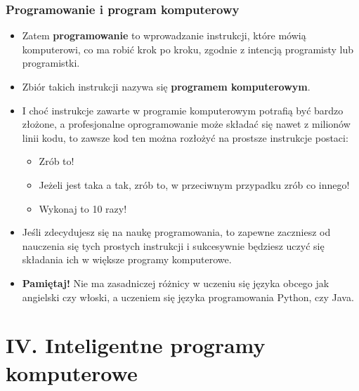 \documentclass{beamer}
\begin{document}
\begin{frame}[fragile]
\frametitle{Programowanie i program komputerowy}
\begin{itemize}
\item Zatem \textbf{programowanie} to wprowadzanie instrukcji, które mówią komputerowi, co ma robić krok po kroku, zgodnie z intencją programisty lub programistki.
\item Zbiór takich instrukcji nazywa się \textbf{programem komputerowym}. 
\item I choć instrukcje zawarte w programie komputerowym potrafią być bardzo złożone, a profesjonalne oprogramowanie może składać się nawet z milionów linii kodu, to zawsze kod ten można rozłożyć na prostsze instrukcje postaci: 
	\begin{itemize}
	\item Zrób to!
	\item Jeżeli jest taka a tak, zrób to, w przeciwnym przypadku zrób co innego!
	\item Wykonaj to 10 razy!
	\end{itemize}
\item Jeśli zdecydujesz się na naukę programowania, to zapewne zaczniesz od nauczenia się tych prostych instrukcji i sukcesywnie będziesz uczyć się składania ich w większe programy komputerowe. 
\item \textbf{Pamiętaj!} Nie ma zasadniczej różnicy w uczeniu się języka obcego jak angielski czy włoski, a uczeniem się języka programowania Python, czy Java. 
\end{itemize}

\end{frame}

\section{IV. Inteligentne programy komputerowe}
\end{document}
